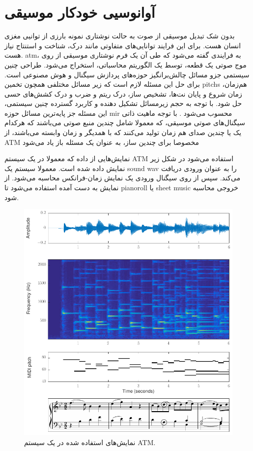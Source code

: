 \section{آوانوسیی خودکار موسیقی}
بدون شک تبدیل موسیقی از صوت به حالت نوشتاری نمونه بارزی از توانیی مغزی انسان
هست. برای این فرایند توانایی‌های متفاوتی مانند درک، شناخت و استنتاج نیاز هست.
\gls{atm}، به فرایندی گفته می‌شود که طی آن یک فرم نوشتاری موسیقی از روی موج صوتی
یک قطعه، توسط یک الگوریتم محاسباتی، استخراج می‌شود. طراحی چنین سیستمی جزو مسائل
چالش‌برانگیز حوزه‌های پردازش سیگنال و هوش مصنوعی است. برای حل این مسئله لازم است
که زیر مسائل مختلفی همچون تخمین \glspl{pitch} هم‌زمان، زمان شروع و پایان نت‌ها،
تشخیص ساز، درک ریتم و ضرب و درک کشش‌های حسی حل شود. با توجه به حجم زیرمسائل
تشکیل دهنده و کاربرد گسترده چنین سیستمی، این مسئله جز پایه‌ترین مسائل حوزه
\gls{mir} محسوب می‌شود \cite{klapuri2007signal,benetos2013automatic}. با توجه
ماهیت ذاتی سیگنال‌های صوتی موسیقی، که معمولا شامل چندین منبع صوتی می‌باشند که
هرکدام یک یا چندین صدای هم زمان تولید می‌کنند که با همدیگر و زمان وابسته
می‌باشند، از \gls{ATM} مخصوصا برای چندین ساز، به عنوان یک مسئله باز یاد می‌شود
\cite{benetos2013automatic}

نمایش‌هایی از داده که معمولا در یک سیستم \gls{ATM} استفاده می‌شود در شکل زیر
نمایش داده شده است. معمولا سیستم یک \gls{sound wav} را به عنوان ورودی دریافت
می‌کند. سپس از روی سیگنال ورودی یک نمایش زمان-فرانکس محاسبه می‌شود. از نمایش به
دست آمده استفاده می‌شود تا \gls{pianoroll} یا \gls{sheet music} خروجی محاسبه
شود.
\begin{figure}[]
    \centering
    \includegraphics[width=12cm]{./statics/atm_data.png}
    \caption{نمایش‌های استفاده شده در یک سیستم \gls{ATM}.}
\end{figure}


